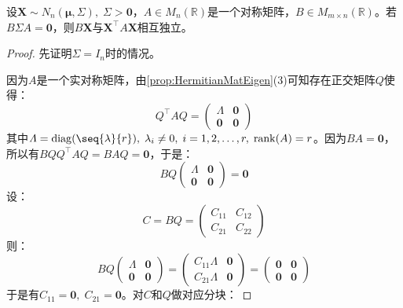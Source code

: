 \begin{theorem}\label{theo:BXXAXIndependent}
	设$\mathbf{X}\sim N_n(\boldsymbol{\mu},\Sigma),\;\Sigma>\mathbf{0}$，$A\in M_{n}(\mathbb{R})$是一个对称矩阵，$B\in M_{m\times n}(\mathbb{R})$。若$B\Sigma A=\mathbf{0}$，则$B\mathbf{X}$与$\mathbf{X}^{\top}A\mathbf{X}$相互独立。
\end{theorem}
\begin{proof}
	先证明$\Sigma=I_n$时的情况。\par
	因为$A$是一个实对称矩阵，由\cref{prop:HermitianMatEigen}(3)可知存在正交矩阵$Q$使得：
	\begin{equation*}
		Q^{\top}AQ=
		\begin{pmatrix}
			\varLambda & \mathbf{0} \\
			\mathbf{0} & \mathbf{0}
		\end{pmatrix}
	\end{equation*}
	其中$\varLambda=\operatorname{diag}(\seq{\lambda}{r}),\;\lambda_i\ne0,\;i=1,2,\dots,r,\;\operatorname{rank}(A)=r$。因为$BA=\mathbf{0}$，所以有$BQQ^{\top}AQ=BAQ=\mathbf{0}$，于是：
	\begin{equation*}
		BQ
		\begin{pmatrix}
			\varLambda & \mathbf{0} \\
			\mathbf{0} & \mathbf{0}
		\end{pmatrix}
		=\mathbf{0}
	\end{equation*}
	设：
	\begin{equation*}
		C=BQ=
		\begin{pmatrix}
			C_{11} & C_{12} \\
			C_{21} & C_{22}
		\end{pmatrix}
	\end{equation*}
	则：
	\begin{equation*}
		BQ
		\begin{pmatrix}
			\varLambda & \mathbf{0} \\
			\mathbf{0} & \mathbf{0}
		\end{pmatrix}
		=
		\begin{pmatrix}
			C_{11}\varLambda & \mathbf{0} \\
			C_{21}\varLambda & \mathbf{0}
		\end{pmatrix}
		=\begin{pmatrix}
			\mathbf{0} & \mathbf{0} \\
			\mathbf{0} & \mathbf{0}
		\end{pmatrix}
	\end{equation*}
	于是有$C_{11}=\mathbf{0},\;C_{21}=\mathbf{0}$。对$C$和$Q$做对应分块：

\end{proof}
